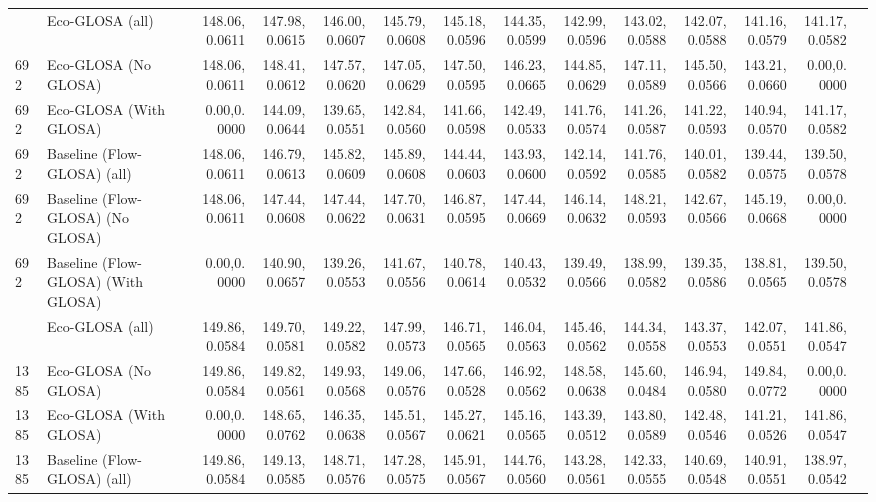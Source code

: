 \begin{table}[ht]
{\begin{tabular}{llrrrrrrrrrrrr}
      \addlinespace
      692  & Eco-GLOSA (all)            & 148.06,0.0611 & 147.98,0.0615 & 146.00,0.0607 & 145.79,0.0608 & 145.18,0.0596 & 144.35,0.0599 & 142.99,0.0596 & 143.02,0.0588 & 142.07,0.0588 & 141.16,0.0579 & 141.17,0.0582 \\
      692  & Eco-GLOSA (No GLOSA)       & 148.06,0.0611 & 148.41,0.0612 & 147.57,0.0620 & 147.05,0.0629 & 147.50,0.0595 & 146.23,0.0665 & 144.85,0.0629 & 147.11,0.0589 & 145.50,0.0566 & 143.21,0.0660 &   0.00,0.0000 \\
      692  & Eco-GLOSA (With GLOSA)     &   0.00,0.0000 & 144.09,0.0644 & 139.65,0.0551 & 142.84,0.0560 & 141.66,0.0598 & 142.49,0.0533 & 141.76,0.0574 & 141.26,0.0587 & 141.22,0.0593 & 140.94,0.0570 & 141.17,0.0582 \\
      692  & Baseline (Flow-GLOSA) (all)   & 148.06,0.0611 & 146.79,0.0613 & 145.82,0.0609 & 145.89,0.0608 & 144.44,0.0603 & 143.93,0.0600 & 142.14,0.0592 & 141.76,0.0585 & 140.01,0.0582 & 139.44,0.0575 & 139.50,0.0578 \\
      692  & Baseline (Flow-GLOSA) (No GLOSA) & 148.06,0.0611 & 147.44,0.0608 & 147.44,0.0622 & 147.70,0.0631 & 146.87,0.0595 & 147.44,0.0669 & 146.14,0.0632 & 148.21,0.0593 & 142.67,0.0566 & 145.19,0.0668 &   0.00,0.0000 \\
      692  & Baseline (Flow-GLOSA) (With GLOSA) &   0.00,0.0000 & 140.90,0.0657 & 139.26,0.0553 & 141.67,0.0556 & 140.78,0.0614 & 140.43,0.0532 & 139.49,0.0566 & 138.99,0.0582 & 139.35,0.0586 & 138.81,0.0565 & 139.50,0.0578 \\
      \addlinespace
      1385 & Eco-GLOSA (all)            & 149.86,0.0584 & 149.70,0.0581 & 149.22,0.0582 & 147.99,0.0573 & 146.71,0.0565 & 146.04,0.0563 & 145.46,0.0562 & 144.34,0.0558 & 143.37,0.0553 & 142.07,0.0551 & 141.86,0.0547 \\
      1385 & Eco-GLOSA (No GLOSA)       & 149.86,0.0584 & 149.82,0.0561 & 149.93,0.0568 & 149.06,0.0576 & 147.66,0.0528 & 146.92,0.0562 & 148.58,0.0638 & 145.60,0.0484 & 146.94,0.0580 & 149.84,0.0772 &   0.00,0.0000 \\
      1385 & Eco-GLOSA (With GLOSA)     &   0.00,0.0000 & 148.65,0.0762 & 146.35,0.0638 & 145.51,0.0567 & 145.27,0.0621 & 145.16,0.0565 & 143.39,0.0512 & 143.80,0.0589 & 142.48,0.0546 & 141.21,0.0526 & 141.86,0.0547 \\
      1385 & Baseline (Flow-GLOSA) (all)   & 149.86,0.0584 & 149.13,0.0585 & 148.71,0.0576 & 147.28,0.0575 & 145.91,0.0567 & 144.76,0.0560 & 143.28,0.0561 & 142.33,0.0555 & 140.69,0.0548 & 140.91,0.0551 & 138.97,0.0542 \\

\end{tabular}}
\end{table}
